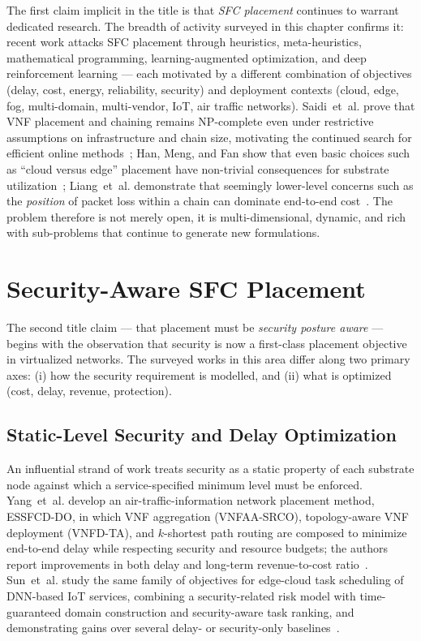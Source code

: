 The first claim implicit in the title is that \textit{SFC placement}
continues to warrant dedicated research. The breadth of activity
surveyed in this chapter confirms it: recent work attacks SFC
placement through heuristics, meta-heuristics, mathematical
programming, learning-augmented optimization, and deep reinforcement
learning --- each motivated by a different combination of objectives
(delay, cost, energy, reliability, security) and deployment contexts
(cloud, edge, fog, multi-domain, multi-vendor, IoT, air traffic
networks). Saidi~et~al. prove that VNF placement and chaining remains
NP-complete even under restrictive assumptions on infrastructure and
chain size, motivating the continued search for efficient online
methods~\cite{saidi_constrained_2024}; Han, Meng, and Fan show that
even basic choices such as ``cloud versus edge'' placement have
non-trivial consequences for substrate
utilization~\cite{han_sfc_2024}; Liang~et~al. demonstrate that
seemingly lower-level concerns such as the \emph{position} of packet
loss within a chain can dominate end-to-end
cost~\cite{liang_position-aware_2024}. The problem therefore is not
merely open, it is multi-dimensional, dynamic, and rich with
sub-problems that continue to generate new formulations.

\section{Security-Aware SFC Placement}
\label{sec:lr_security_aware}

The second title claim --- that placement must be \textit{security
posture aware} --- begins with the observation that security is now a
first-class placement objective in virtualized networks. The surveyed
works in this area differ along two primary axes: (i) how the security
requirement is modelled, and (ii) what is optimized (cost, delay, revenue,
protection).

\subsection{Static-Level Security and Delay Optimization}

An influential strand of work treats security as a static property of
each substrate node against which a service-specified minimum level
must be enforced. Yang~et~al. develop an air-traffic-information
network placement method, ESSFCD-DO, in which VNF aggregation
(VNFAA-SRCO), topology-aware VNF deployment (VNFD-TA), and $k$-shortest
path routing are composed to minimize end-to-end delay while
respecting security and resource budgets; the authors report
improvements in both delay and long-term revenue-to-cost
ratio~\cite{yang_efficient_2024}. Sun~et~al. study the same family of
objectives for edge-cloud task scheduling of DNN-based IoT services,
combining a security-related risk model with time-guaranteed domain
construction and security-aware task ranking, and demonstrating gains
over several delay- or security-only
baselines~\cite{sun_security-aware_2023}.

